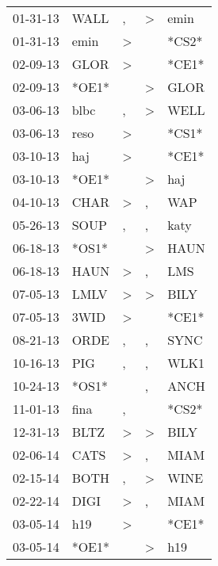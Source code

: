 \begin{supertabular}{lllll}
 01-31-13 &   WALL &                , &     \textgreater &   emin \\
 01-31-13 &   emin &     \textgreater &                  &  *CS2* \\
 02-09-13 &   GLOR &     \textgreater &                  &  *CE1* \\
 02-09-13 &  *OE1* &                  &     \textgreater &   GLOR \\
 03-06-13 &   blbc &                , &     \textgreater &   WELL \\
 03-06-13 &   reso &     \textgreater &                  &  *CS1* \\
 03-10-13 &    haj &     \textgreater &                  &  *CE1* \\
 03-10-13 &  *OE1* &                  &     \textgreater &    haj \\
 04-10-13 &   CHAR &     \textgreater &                , &    WAP \\
 05-26-13 &   SOUP &                , &                , &   katy \\
 06-18-13 &  *OS1* &                  &     \textgreater &   HAUN \\
 06-18-13 &   HAUN &     \textgreater &                , &    LMS \\
 07-05-13 &   LMLV &     \textgreater &     \textgreater &   BILY \\
 07-05-13 &   3WID &     \textgreater &                  &  *CE1* \\
 08-21-13 &   ORDE &                , &                , &   SYNC \\
 10-16-13 &    PIG &                , &                , &   WLK1 \\
 10-24-13 &  *OS1* &                  &                , &   ANCH \\
 11-01-13 &   fina &                , &                  &  *CS2* \\
 12-31-13 &   BLTZ &     \textgreater &     \textgreater &   BILY \\
 02-06-14 &   CATS &     \textgreater &                , &   MIAM \\
 02-15-14 &   BOTH &                , &     \textgreater &   WINE \\
 02-22-14 &   DIGI &     \textgreater &                , &   MIAM \\
 03-05-14 &    h19 &     \textgreater &                  &  *CE1* \\
 03-05-14 &  *OE1* &                  &     \textgreater &    h19 \\

\end{supertabular}
